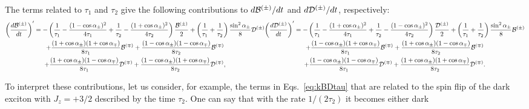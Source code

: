 \documentclass[twocolumn,showpacs,preprintnumbers,amsmath,amssymb,aps]{revtex4-1}
\begin{document}
\begin{widetext}
The terms related to $\tau_1$ and $\tau_2$ give the following
contributions to ${d {\cal B}^{(\pm)}}/{dt}$ and ${d {\cal
D}^{(\pm)}}/{dt}$, respectively:
\begin{subequations}
  \label{eq:kBDtau}
  \begin{multline}\label{kBtau}
    \left(\frac{d {\cal B}^{(\pm)}}{dt}\right)' = - \left( \frac{1}{\tau_1}  - \frac{(1-\cos\alpha_\pm)^2}{4\tau_1} + \frac{1}{\tau_2}  -  \frac{(1+\cos\alpha_\pm)^2}{4\tau_2} \right)\frac{{\cal B}^{(\pm)}}{2} + \left( \frac{1}{\tau_1} + \frac{1}{\tau_2} \right) \frac{\sin^2\alpha_\pm}{8} {\cal D}^{(\pm)} \\
+ \frac{(1+\cos\alpha_\pm)(1+\cos\alpha_\mp)}{8\tau_1}{\cal B}^{(\mp)}  +\frac{(1-\cos\alpha_\pm)(1-\cos\alpha_\mp)}{8\tau_2}{\cal B}^{(\mp)} \\
+ \frac{(1+\cos\alpha_\pm)(1-\cos\alpha_\mp)}{8\tau_1}{\cal D}^{(\mp)}  +\frac{(1-\cos\alpha_\pm)(1+\cos\alpha_\mp)}{8\tau_2}{\cal D}^{(\mp)},
  \end{multline}
  \begin{multline}\label{kDtau}
    \left(\frac{d {\cal D}^{(\pm)}}{dt}\right)' = - \left( \frac{1}{\tau_1}  - \frac{(1+\cos\alpha_\pm)^2}{4\tau_1} + \frac{1}{\tau_2}  -  \frac{(1-\cos\alpha_\pm)^2}{4\tau_2} \right)\frac{{\cal D}^{(\pm)}}{2} + \left( \frac{1}{\tau_1} + \frac{1}{\tau_2} \right) \frac{\sin^2\alpha_\pm}{8} {\cal B}^{(\pm)}  \\
+ \frac{(1-\cos\alpha_\pm)(1+\cos\alpha_\mp)}{8\tau_1}{\cal B}^{(\mp)}  +\frac{(1+\cos\alpha_\pm)(1-\cos\alpha_\mp)}{8\tau_2}{\cal B}^{(\mp)}\\
+ \frac{(1-\cos\alpha_\pm )(1-\cos\alpha_\mp)}{8\tau_1}{\cal D}^{(\mp)}   +\frac{(1+\cos\alpha_\pm)(1+\cos\alpha_\mp)}{8\tau_2}{\cal D}^{(\mp)}.
  \end{multline}
\end{subequations}
\end{widetext}
To interpret these  contributions, let us consider, for example, the
terms in Eqs.~\eqref{eq:kBDtau} that are related to the spin flip of
the dark exciton with $J_z = +3/2$ described by the time $\tau_2$.
One can say that with the rate $1/(2\tau_2)$ it becomes either dark
\end{document}
